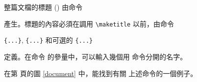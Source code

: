 整篇文檔的標題 () 由命令
\begin{lscommand}
\end{lscommand}
\noindent 產生。標題的內容必須在調用 \verb|\maketitle| 以前，由命令
\begin{lscommand}
\verb|{...}|, \verb|{...}| 和可選的 \verb|{...}|
\end{lscommand}
\noindent
定義。在命令  的參量中，可以輸入幾個用  命令分開的名字。


在第 \pageref{document} 頁的圖 \ref{document} 中，能找到有關
上述命令的一個例子。


